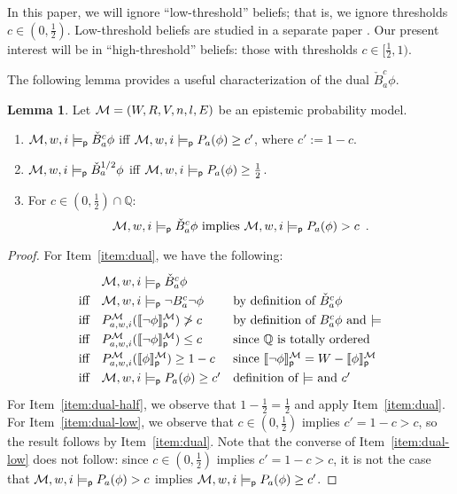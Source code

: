 \documentclass[12pt]{article}
\theoremstyle{definition}
\newtheorem{lemma}[theorem]{Lemma}
\newcommand{\Rat}{\mathbb{Q}}  %
\newcommand{\M}{{\cal M}}      %
\newcommand{\modelsp}{\models_{\mathsf{p}}}                  %
\newcommand{\semp}[1]{\llbracket{#1}\rrbracket_{\mathsf{p}}} %
\begin{document}
In this paper, we will ignore ``low-threshold'' beliefs; that is, we
ignore thresholds $c\in(0,\frac 12)$.  Low-threshold beliefs are
studied in a separate paper \cite{EijRen13:Manu}.  Our present
interest will be in ``high-threshold'' beliefs: those with thresholds
$c\in[\frac 12,1)$.

The following lemma provides a useful characterization of the dual
$\check B^c_a\phi$.

\begin{lemma}
  \label{lemma:dual}
  Let $\M=(W,R,V,n,l,E)$ be an epistemic probability model.
  \begin{enumerate}
  \item \label{item:dual} $\M,w,i\modelsp\check B_a^c\phi$ iff
    $\M,w,i\modelsp P_a(\phi)\geq c'$, where $c':=1-c$.

  \item \label{item:dual-half} $\M,w,i\modelsp\check B_a^{1/2}\phi$ iff
    $\M,w,i\modelsp P_a(\phi)\geq \frac 12$.

  \item \label{item:dual-low} For $c\in(0,\frac 12)\cap\Rat$:
    \[
    \M,w,i\modelsp\check B_a^c\phi \text{ implies } \M,w,i\modelsp
    P_a(\phi)>c\enspace\text{.}
    \]
  \end{enumerate}
\end{lemma}
\begin{proof}
  For Item~\ref{item:dual}, we have the following:
  \[
  \renewcommand{\arraystretch}{1.3}
  \begin{array}{lll}
    &
    \M,w,i\modelsp\check B^c_a\phi
    \\
    \text{iff} &
    \M,w,i\modelsp\lnot B^c_a\lnot\phi 
    & \text{by definition of $\check B^c_a\phi$}
    \\
    \text{iff} &
    P^\M_{a,w,i}(\semp{\lnot\phi}^\M)\not>c
    & \text{by definition of $B^c_a\phi$ and $\models$}
    \\
    \text{iff} &
    P^\M_{a,w,i}(\semp{\lnot\phi}^\M)\leq c
    & \text{since $\Rat$ is totally ordered}
    \\
    \text{iff} &
    P^\M_{a,w,i}(\semp{\phi}^\M)\geq 1-c
    & \text{since $\semp{\lnot\phi}^\M=W-\semp{\phi}^\M$}
    \\
    \text{iff} &
    \M,w,i\modelsp P_a(\phi)\geq c'
    & \text{definition of $\models$ and $c'$}
  \end{array}
  \]
  For Item~\ref{item:dual-half}, we observe that $1-\frac 12=\frac 12$
  and apply Item~\ref{item:dual}.  For Item~\ref{item:dual-low}, we
  observe that $c\in(0,\frac 12)$ implies $c'=1-c>c$, so the result
  follows by Item~\ref{item:dual}.  Note that the converse of
  Item~\ref{item:dual-low} does not follow: since $c\in(0,\frac 12)$
  implies $c'=1-c>c$, it is not the case that $\M,w,i\modelsp
  P_a(\phi)>c$ implies $\M,w,i\modelsp P_a(\phi)\geq c'$.
\end{proof}
\end{document}
